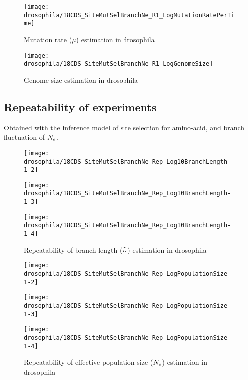 \begin{figure}[H]
    \centering
    \texttt{[image: drosophila/18CDS\_SiteMutSelBranchNe\_R1\_LogMutationRatePerTime]}
    \caption[Mutation rate estimation in drosophila]{Mutation rate ($\mu$) estimation in drosophila}
\end{figure}

\begin{figure}[H]
    \centering
    \texttt{[image: drosophila/18CDS\_SiteMutSelBranchNe\_R1\_LogGenomeSize]}
    \caption[Genome size estimation in drosophila]{Genome size estimation in drosophila}
\end{figure}

\subsection{Repeatability of experiments}
Obtained with the inference model of site selection for amino-acid, and branch fluctuation of $N_{\mathrm{e}}$.

\begin{figure}[H]
    \centering
    \begin{minipage}{0.32\linewidth}
        \texttt{[image: drosophila/18CDS\_SiteMutSelBranchNe\_Rep\_Log10BranchLength-1-2]}
    \end{minipage}    \hfill
    \begin{minipage}{0.32\linewidth}
        \texttt{[image: drosophila/18CDS\_SiteMutSelBranchNe\_Rep\_Log10BranchLength-1-3]}
    \end{minipage}    \hfill
    \begin{minipage}{0.32\linewidth}
        \texttt{[image: drosophila/18CDS\_SiteMutSelBranchNe\_Rep\_Log10BranchLength-1-4]}
    \end{minipage}
    \caption[Repeatability of branch length estimation in drosophila]{Repeatability of branch length ($L$) estimation in drosophila}
\end{figure}

\begin{figure}[H]
    \centering
    \begin{minipage}{0.32\linewidth}
        \texttt{[image: drosophila/18CDS\_SiteMutSelBranchNe\_Rep\_LogPopulationSize-1-2]}
    \end{minipage}    \hfill
    \begin{minipage}{0.32\linewidth}
        \texttt{[image: drosophila/18CDS\_SiteMutSelBranchNe\_Rep\_LogPopulationSize-1-3]}
    \end{minipage}    \hfill
    \begin{minipage}{0.32\linewidth}
        \texttt{[image: drosophila/18CDS\_SiteMutSelBranchNe\_Rep\_LogPopulationSize-1-4]}
    \end{minipage}
    \caption[Repeatability of \gls{effective-population-size} estimation in drosophila]{Repeatability of \gls{effective-population-size} ($N_{\mathrm{e}}$) estimation in drosophila}
\end{figure}

